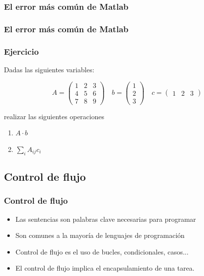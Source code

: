 \documentclass[12pt]{beamer}
\begin{document}
\begin{frame}
\frametitle{El error más común de Matlab}
\testcode
\end{frame}


\begin{frame}
\frametitle{El error más común de Matlab}
\testcode
\end{frame}

\begin{frame}
  \frametitle{Ejercicio}
  Dadas las siguientes variables:

\[
A = \left( \begin{array}{ccc}
1&2&3\\
4&5&6\\
7&8&9
\end{array} \right) \quad
b = \left( \begin{array}{c}
1\\2\\3
\end{array} \right) \quad
c = \left( \begin{array}{ccc}
1&2&3
\end{array} \right) 
\]

realizar las siguientes operaciones

\begin{enumerate}
\item $A\cdot b$
\item $\sum_i A_{ij}c_i$
\end{enumerate}
\end{frame}

\subsection{Control de flujo}

\begin{frame}
\frametitle{Control de flujo}
\begin{itemize}
\item Las sentencias son palabras clave necesarias para programar
\item Son comunes a la mayoría de lenguajes de programación
\item Control de flujo es el uso de bucles, condicionales, casos...
\item El control de flujo implica el encapsulamiento de una tarea.
\end{itemize}
\end{frame}
\end{document}
